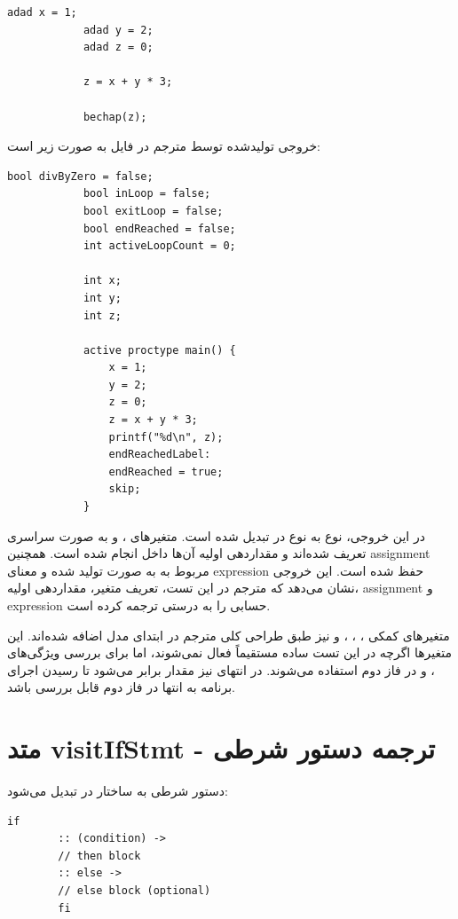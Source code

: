 \documentclass[12pt]{report}
\begin{document}
	\begin{latin}
		\begin{lstlisting}[style=hashstyle]
			adad x = 1;
			adad y = 2;
			adad z = 0;
			
			z = x + y * 3;
			
			bechap(z);
		\end{lstlisting}
	\end{latin}
	
	خروجی تولیدشده توسط مترجم در فایل  به صورت زیر است:
	
	\begin{latin}
		\begin{lstlisting}[style=codestyle]
			bool divByZero = false;
			bool inLoop = false;
			bool exitLoop = false;
			bool endReached = false;
			int activeLoopCount = 0;
			
			int x;
			int y;
			int z;
			
			active proctype main() {
				x = 1;
				y = 2;
				z = 0;
				z = x + y * 3;
				printf("%d\n", z);
				endReachedLabel:
				endReached = true;
				skip;
			}
		\end{lstlisting}
	\end{latin}
	
	در این خروجی، نوع  به نوع  در  تبدیل شده است.
	متغیرهای ،  و  به صورت سراسری تعریف شده‌اند و مقداردهی اولیه آن‌ها داخل  انجام شده است.
	همچنین assignment مربوط به  به صورت  تولید شده و معنای expression حفظ شده است.
	این خروجی نشان می‌دهد که مترجم در این تست، تعریف متغیر، مقداردهی اولیه، assignment و expression حسابی را به درستی ترجمه کرده است.
	
	متغیرهای کمکی ، ، ،  و  نیز طبق طراحی کلی مترجم در ابتدای مدل اضافه شده‌اند.
	این متغیرها اگرچه در این تست ساده مستقیماً فعال نمی‌شوند، اما برای بررسی ویژگی‌های ،  و  در فاز دوم استفاده می‌شوند.
	در انتهای  نیز مقدار  برابر  می‌شود تا رسیدن اجرای برنامه به انتها در فاز دوم قابل بررسی باشد.
	
	\section{متد visitIfStmt - ترجمه دستور شرطی}
	
	دستور شرطی  به ساختار  در  تبدیل می‌شود:
	\setLTR
	\begin{lstlisting}[language=Promela]
		if
		:: (condition) -> 
		// then block
		:: else ->
		// else block (optional)
		fi
	\end{lstlisting}
	\setRTL
	
\end{document}
